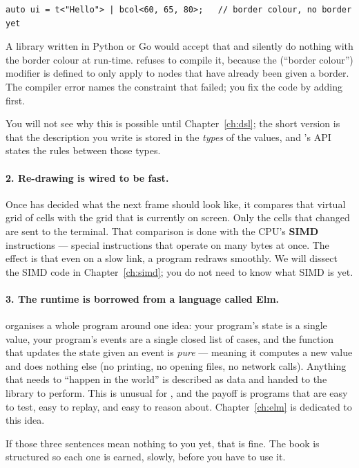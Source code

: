 \begin{lstlisting}
auto ui = t<"Hello"> | bcol<60, 65, 80>;   // border colour, no border yet
\end{lstlisting}

A library written in Python or Go would accept that and silently do
nothing with the border colour at run-time. \maya{} refuses to
compile it, because the  (``border colour'') modifier is
defined to only apply to nodes that have already been given a
border. The compiler error names the constraint that failed; you fix
the code by adding  first.

You will not see why this is possible until Chapter~\ref{ch:dsl}; the
short version is that the description you write is stored in the
\emph{types} of the \cpp{} values, and \maya{}'s API states the rules
between those types.

\paragraph{2. Re-drawing is wired to be fast.}
Once \maya{} has decided what the next frame should look like, it
compares that virtual grid of cells with the grid that is currently on
screen. Only the cells that changed are sent to the terminal. That
comparison is done with the CPU's \textbf{SIMD} instructions ---
special instructions that operate on many bytes at once. The effect
is that even on a slow  link, a \maya{} program redraws
smoothly. We will dissect the SIMD code in Chapter~\ref{ch:simd}; you
do not need to know what SIMD is yet.

\paragraph{3. The runtime is borrowed from a language called Elm.}
\maya{} organises a whole program around one idea: your program's
state is a single value, your program's events are a single closed
list of cases, and the function that updates the state given an event
is \emph{pure} --- meaning it computes a new value and does nothing
else (no printing, no opening files, no network calls). Anything that
needs to ``happen in the world'' is described as data and handed to
the library to perform. This is unusual for \cpp{}, and the payoff is
programs that are easy to test, easy to replay, and easy to reason
about. Chapter~\ref{ch:elm} is dedicated to this idea.

If those three sentences mean nothing to you yet, that is fine. The
book is structured so each one is earned, slowly, before you have to
use it.

